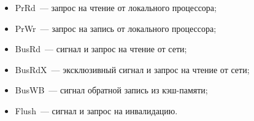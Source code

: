       \begin{itemize}


      \item  PrRd~--- запрос на чтение от локального процессора;


\item PrWr~--- запрос на запись от локального процессора;


\item BusRd~--- сигнал и запрос на чтение от сети;


\item BusRdX~--- эксклюзивный сигнал и запрос на чтение от сети;


\item BusWB~--- сигнал обратной запись из кэш-памяти;


\item  Flush~--- сигнал и запрос на инвалидацию.


\end{itemize}





